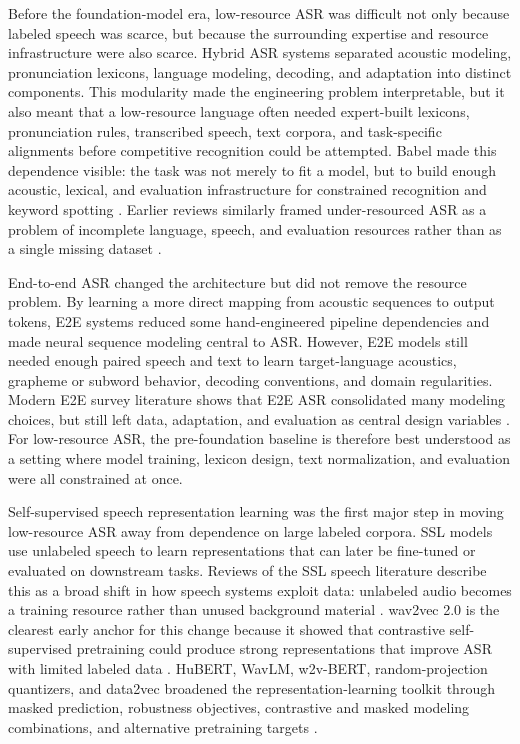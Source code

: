 \documentclass[pdflatex,sn-basic]{sn-jnl}
\theoremstyle{thmstyleone}
\theoremstyle{thmstyletwo}
\theoremstyle{thmstylethree}
\begin{document}
Before the foundation-model era, low-resource ASR was difficult not only because labeled speech was scarce, but because the surrounding expertise and resource infrastructure were also scarce. Hybrid ASR systems separated acoustic modeling, pronunciation lexicons, language modeling, decoding, and adaptation into distinct components. This modularity made the engineering problem interpretable, but it also meant that a low-resource language often needed expert-built lexicons, pronunciation rules, transcribed speech, text corpora, and task-specific alignments before competitive recognition could be attempted. Babel made this dependence visible: the task was not merely to fit a model, but to build enough acoustic, lexical, and evaluation infrastructure for constrained recognition and keyword spotting \citep{gales2014_babel_project_research_cued}. Earlier reviews similarly framed under-resourced ASR as a problem of incomplete language, speech, and evaluation resources rather than as a single missing dataset \citep{besacier2014_underresourced_asr_survey}.

End-to-end ASR changed the architecture but did not remove the resource problem. By learning a more direct mapping from acoustic sequences to output tokens, E2E systems reduced some hand-engineered pipeline dependencies and made neural sequence modeling central to ASR. However, E2E models still needed enough paired speech and text to learn target-language acoustics, grapheme or subword behavior, decoding conventions, and domain regularities. Modern E2E survey literature shows that E2E ASR consolidated many modeling choices, but still left data, adaptation, and evaluation as central design variables \citep{prabhavalkar2023_e2e_asr_survey}. For low-resource ASR, the pre-foundation baseline is therefore best understood as a setting where model training, lexicon design, text normalization, and evaluation were all constrained at once.

Self-supervised speech representation learning was the first major step in moving low-resource ASR away from dependence on large labeled corpora. SSL models use unlabeled speech to learn representations that can later be fine-tuned or evaluated on downstream tasks. Reviews of the SSL speech literature describe this as a broad shift in how speech systems exploit data: unlabeled audio becomes a training resource rather than unused background material \citep{mohamed2022_ssl_review}. wav2vec 2.0 is the clearest early anchor for this change because it showed that contrastive self-supervised pretraining could produce strong representations that improve ASR with limited labeled data \citep{baevski2020wav2vec2}. HuBERT, WavLM, w2v-BERT, random-projection quantizers, and data2vec broadened the representation-learning toolkit through masked prediction, robustness objectives, contrastive and masked modeling combinations, and alternative pretraining targets \citep{hsu2021hubert,chen2022wavlm,chung2021_w2vbert,pmlr-v162-chiu22a,pmlr-v162-baevski22a}.
\end{document}
